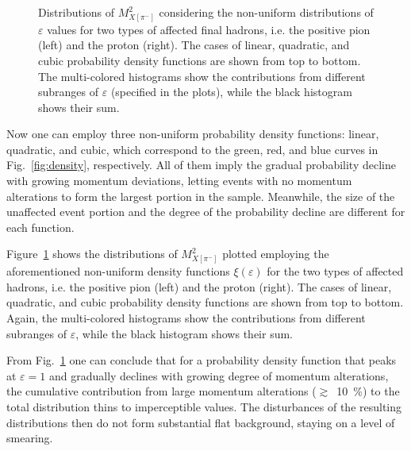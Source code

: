 \begin{figure}[!ht]
\begin{center}
\end{center}
\vspace{-0.6cm}
\caption{\small Distributions of $M_{X[\pi^{-}]}^{2}$ considering the non-uniform distributions of $\varepsilon$ values for two types of affected final hadrons, i.e. the positive pion (left) and the proton (right). The cases of linear, quadratic, and cubic probability density functions are shown from top to bottom. The multi-colored histograms show the contributions from different subranges of $\varepsilon$ (specified in the plots), while the black histogram shows their sum. }
\label{fig:fsi_combined}
\end{figure}

Now one can employ three non-uniform probability density functions: linear, quadratic, and cubic, which correspond to the green, red, and blue curves in Fig.~\ref{fig:density}, respectively. All of them imply the gradual probability decline with growing momentum deviations, letting events with no momentum alterations to form the largest portion in the sample. Meanwhile, the size of the unaffected event portion and the degree of the probability decline are different for each function.


Figure~\ref{fig:fsi_combined} shows the distributions of $M_{X[\pi^{-}]}^{2}$ plotted employing the aforementioned non-uniform density functions $\xi(\varepsilon)$ for the two types of affected hadrons, i.e. the positive pion (left) and the proton (right). The cases of linear, quadratic, and cubic probability density functions are shown from top to bottom. Again, the multi-colored histograms show the contributions from different subranges of $\varepsilon$, while the black histogram shows their sum.

From Fig.~\ref{fig:fsi_combined} one can conclude that for a probability density function that peaks at $\varepsilon = 1$ and gradually declines with growing degree of momentum alterations, the cumulative contribution from large momentum alterations ($\gtrsim$~10~\%) to the total distribution thins to imperceptible values. The disturbances of the resulting distributions then do not form substantial flat background, staying on a level of smearing.


\afterpage{\clearpage}






